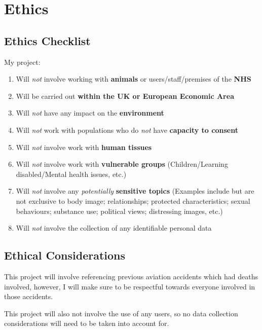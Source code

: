 \documentclass[a4paper]{article}
\begin{document}
\clearpage

\section{Ethics}
\subsection{Ethics Checklist}
My project:
\begin{enumerate}
    \item Will \textit{not} involve working with \textbf{animals} or
        users/staff/premises of the \textbf{NHS}
    \item Will be carried out \textbf{within the UK or European
        Economic Area}
    \item Will \textit{not} have any impact on the \textbf{environment}
    \item Will \textit{not} work with populations who do \textit{not}
        have \textbf{capacity to consent}
    \item Will \textit{not} involve work with \textbf{human tissues}
    \item Will \textit{not} involve work with \textbf{vulnerable groups}
        (Children/Learning disabled/Mental health issues, etc.)
    \item Will \textit{not} involve any \textit{potentially}
        \textbf{sensitive topics} (Examples include but are not
        exclusive to body image; relationships; protected
        characteristics; sexual behaviours; substance use;
        political views; distressing images, etc.)
    \item Will \textit{not} involve the collection of any identifiable
        personal data
\end{enumerate}

\subsection{Ethical Considerations}
This project will involve referencing previous aviation
accidents which had deaths involved, however, I will make
sure to be respectful towards everyone involved in
those accidents.

This project will also not involve the use of any users,
so no data collection considerations will need to be taken
into account for.
\clearpage


\nocite{*}
\printbibliography[heading=bibnumbered]
\end{document}
